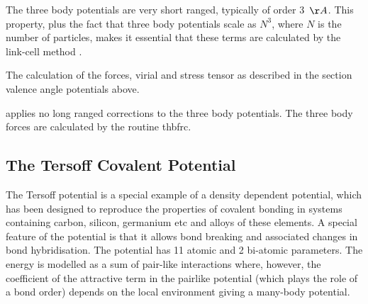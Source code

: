 The three body potentials are very short
ranged, typically of order 3~$\AA$. This property, plus the fact that
three body potentials scale as $N^{3}$,
where $N$ is the number of particles, makes it essential that these
terms are calculated by the link-cell method \cite{eastwood-80a}.

The calculation of the forces, virial and stress tensor as
described in the section valence angle potentials above.

\D{} applies no long ranged corrections to the three body potentials.
The three body forces are calculated by the routine {\sc thbfrc}.

\subsection{The Tersoff Covalent Potential}
\label{tersoff}

The Tersoff potential \cite{tersoff-89a} is a
special example of a density dependent potential, which has been
designed to reproduce the properties of covalent bonding in systems
containing carbon, silicon, germanium etc and alloys of these
elements.  
A special feature of the potential is that it allows bond breaking and
associated changes in bond hybridisation.
The potential has 11 atomic and 2 bi-atomic parameters.  The energy is
modelled as a sum of pair-like interactions where, however, the
coefficient of the attractive term in the pairlike potential (which
plays the role of a bond order) depends on the local environment
giving a many-body potential.

